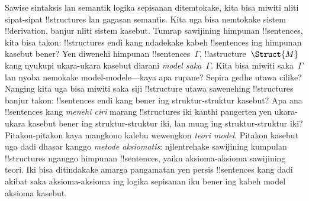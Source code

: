 \documentclass[../../../include/open-logic-section]{subfiles}
\begin{document}


Sawise sintaksis lan semantik logika sepisanan ditemtokake, kita bisa
miwiti nliti sipat-sipat !!{structure}s lan gagasan semantis. Kita uga
bisa nemtokake sistem !!{derivation}, banjur nliti sistem kasebut.
Tumrap sawijining himpunan !!{sentence}s, kita bisa takon: !!{structure}s
endi kang ndadekake kabeh !!{sentence}s ing himpunan kasebut bener?
Yen diwenehi himpunan !!{sentence}s~$\Gamma$, !!a{structure}~$\Struct{M}$
kang nyukupi ukara-ukara kasebut diarani \emph{model saka~$\Gamma$}.
Kita bisa miwiti saka~$\Gamma$ lan nyoba nemokake model-modele---kaya
apa rupane? Sepira gedhe utawa cilike? Nanging kita uga bisa miwiti
saka siji !!{structure} utawa sawenehing !!{structure}s banjur takon:
!!{sentence}s endi kang bener ing struktur-struktur kasebut? Apa ana
!!{sentence}s kang \emph{menehi ciri} marang !!{structure}s iki kanthi
pangerten yen ukara-ukara kasebut bener ing struktur-struktur iki, lan
mung ing struktur-struktur iki? Pitakon-pitakon kaya mangkono
kalebu wewengkon \emph{teori model}. Pitakon kasebut uga dadi dhasar
kanggo \emph{metode aksiomatis}: njlentrehake sawijining kumpulan
!!{structure}s nganggo himpunan !!{sentence}s, yaiku aksioma-aksioma
sawijining teori. Iki bisa ditindakake amarga pangamatan yen persis
!!{sentence}s kang dadi akibat saka aksioma-aksioma ing logika
sepisanan iku bener ing kabeh model aksioma kasebut.
\end{document}
